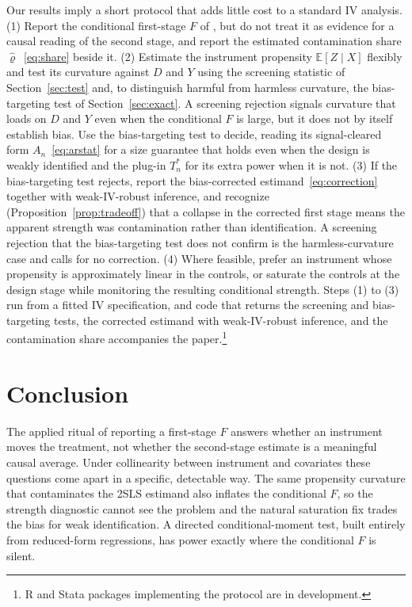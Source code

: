 \documentclass[preprint,11pt,authoryear]{elsarticle}
\theoremstyle{definition}
\newcommand{\E}{\mathbb{E}}
\begin{document}
Our results imply a short protocol that adds little cost to a standard IV
analysis. (1) Report the conditional first-stage $F$ of
\citet{sanderson2016}, but do not treat it as evidence for a causal reading of
the second stage, and report the estimated contamination share
$\hat\varrho$~\eqref{eq:share} beside it. (2) Estimate the instrument propensity
$\E[Z\mid X]$ flexibly and test its curvature against $D$ and $Y$ using the
screening statistic of Section~\ref{sec:test} and, to distinguish harmful from
harmless curvature, the bias-targeting test of Section~\ref{sec:exact}. A screening
rejection signals curvature that loads on $D$ and $Y$ even when the conditional $F$
is large, but it does not by itself establish bias. Use the bias-targeting test to
decide, reading its signal-cleared form $A_n$~\eqref{eq:arstat} for a size guarantee
that holds even when the design is weakly identified and the plug-in $T_n^{\ast}$ for
its extra power when it is not. (3) If the bias-targeting test rejects, report
the bias-corrected estimand~\eqref{eq:correction} together with weak-IV-robust
inference, and
recognize (Proposition~\ref{prop:tradeoff}) that a collapse in the corrected
first stage means the apparent strength was contamination rather than
identification. A screening rejection that the bias-targeting test does not confirm
is the harmless-curvature case and calls for no correction. (4) Where feasible, prefer an instrument whose propensity is
approximately linear in the controls, or saturate the controls at the design
stage while monitoring the resulting conditional strength. Steps (1) to (3) run
from a fitted IV specification, and code that returns the screening and
bias-targeting tests, the corrected estimand with weak-IV-robust inference, and
the contamination share accompanies the paper.\footnote{R and Stata packages implementing the protocol are in development.}

\section{Conclusion}\label{sec:conclusion}

The applied ritual of reporting a first-stage $F$ answers whether an instrument
moves the treatment, not whether the second-stage estimate is a meaningful causal
average. Under collinearity between instrument and covariates these questions come apart in a
specific, detectable way. The same propensity curvature that contaminates the
2SLS estimand also inflates the conditional $F$, so the strength
diagnostic cannot see the problem and the natural saturation fix trades the bias
for weak identification. A directed conditional-moment test, built entirely from
reduced-form regressions, has power exactly where the conditional $F$ is silent.
\end{document}
